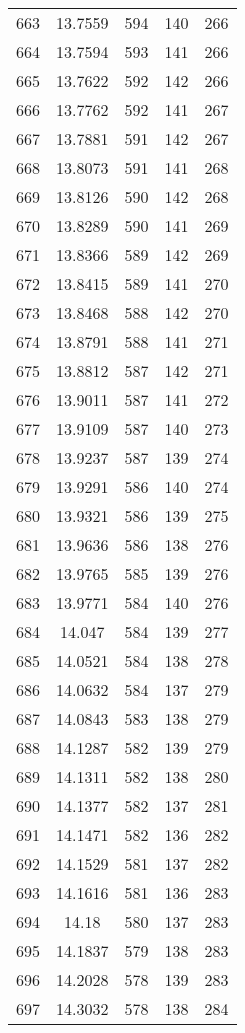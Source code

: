 \documentclass[12pt,a4paper]{article}
\begin{document}
\begin{tabular}{r|cccc}
	663 & 13.7559 & 594 & 140 & 266 \\
	664 & 13.7594 & 593 & 141 & 266 \\
	665 & 13.7622 & 592 & 142 & 266 \\
	666 & 13.7762 & 592 & 141 & 267 \\
	667 & 13.7881 & 591 & 142 & 267 \\
	668 & 13.8073 & 591 & 141 & 268 \\
	669 & 13.8126 & 590 & 142 & 268 \\
	670 & 13.8289 & 590 & 141 & 269 \\
	671 & 13.8366 & 589 & 142 & 269 \\
	672 & 13.8415 & 589 & 141 & 270 \\
	673 & 13.8468 & 588 & 142 & 270 \\
	674 & 13.8791 & 588 & 141 & 271 \\
	675 & 13.8812 & 587 & 142 & 271 \\
	676 & 13.9011 & 587 & 141 & 272 \\
	677 & 13.9109 & 587 & 140 & 273 \\
	678 & 13.9237 & 587 & 139 & 274 \\
	679 & 13.9291 & 586 & 140 & 274 \\
	680 & 13.9321 & 586 & 139 & 275 \\
	681 & 13.9636 & 586 & 138 & 276 \\
	682 & 13.9765 & 585 & 139 & 276 \\
	683 & 13.9771 & 584 & 140 & 276 \\
	684 & 14.047 & 584 & 139 & 277 \\
	685 & 14.0521 & 584 & 138 & 278 \\
	686 & 14.0632 & 584 & 137 & 279 \\
	687 & 14.0843 & 583 & 138 & 279 \\
	688 & 14.1287 & 582 & 139 & 279 \\
	689 & 14.1311 & 582 & 138 & 280 \\
	690 & 14.1377 & 582 & 137 & 281 \\
	691 & 14.1471 & 582 & 136 & 282 \\
	692 & 14.1529 & 581 & 137 & 282 \\
	693 & 14.1616 & 581 & 136 & 283 \\
	694 & 14.18 & 580 & 137 & 283 \\
	695 & 14.1837 & 579 & 138 & 283 \\
	696 & 14.2028 & 578 & 139 & 283 \\
	697 & 14.3032 & 578 & 138 & 284 \\

\end{tabular}
\end{document}
